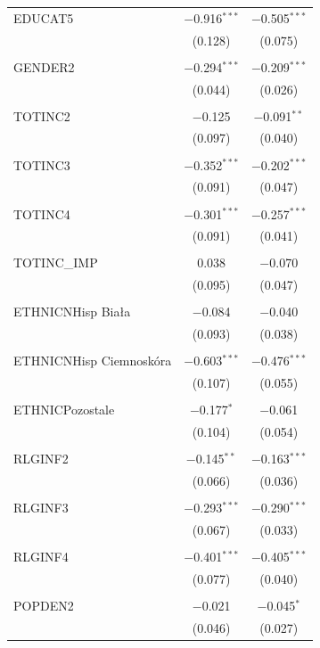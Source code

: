 \begin{tabular}{@{\extracolsep{5pt}}lcc}
 EDUCAT5 & $-$0.916$^{***}$ & $-$0.505$^{***}$ \\ 
  & (0.128) & (0.075) \\ 
  & & \\ 
 GENDER2 & $-$0.294$^{***}$ & $-$0.209$^{***}$ \\ 
  & (0.044) & (0.026) \\ 
  & & \\ 
 TOTINC2 & $-$0.125 & $-$0.091$^{**}$ \\ 
  & (0.097) & (0.040) \\ 
  & & \\ 
 TOTINC3 & $-$0.352$^{***}$ & $-$0.202$^{***}$ \\ 
  & (0.091) & (0.047) \\ 
  & & \\ 
 TOTINC4 & $-$0.301$^{***}$ & $-$0.257$^{***}$ \\ 
  & (0.091) & (0.041) \\ 
  & & \\ 
 TOTINC\_IMP & 0.038 & $-$0.070 \\ 
  & (0.095) & (0.047) \\ 
  & & \\ 
 ETHNICNHisp Biała & $-$0.084 & $-$0.040 \\ 
  & (0.093) & (0.038) \\ 
  & & \\ 
 ETHNICNHisp Ciemnoskóra & $-$0.603$^{***}$ & $-$0.476$^{***}$ \\ 
  & (0.107) & (0.055) \\ 
  & & \\ 
 ETHNICPozostale & $-$0.177$^{*}$ & $-$0.061 \\ 
  & (0.104) & (0.054) \\ 
  & & \\ 
 RLGINF2 & $-$0.145$^{**}$ & $-$0.163$^{***}$ \\ 
  & (0.066) & (0.036) \\ 
  & & \\ 
 RLGINF3 & $-$0.293$^{***}$ & $-$0.290$^{***}$ \\ 
  & (0.067) & (0.033) \\ 
  & & \\ 
 RLGINF4 & $-$0.401$^{***}$ & $-$0.405$^{***}$ \\ 
  & (0.077) & (0.040) \\ 
  & & \\ 
 POPDEN2 & $-$0.021 & $-$0.045$^{*}$ \\ 
  & (0.046) & (0.027) \\ 

\end{tabular}

